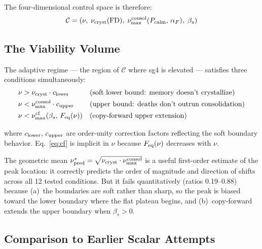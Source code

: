 \documentclass[11pt]{article}
\begin{document}
The four-dimensional control space is therefore:
\[
\mathcal{C} = (\nu,\; \nu_{\rm cryst}(\text{FD}),\; \nu_{\rm max}^{\rm consol}(P_{\rm calm},\,\alpha_F),\; \beta_s)
\]

\subsection{The Viability Volume}

The adaptive regime --- the region of $\mathcal{C}$ where sg4 is elevated ---
satisfies three conditions simultaneously:
\begin{align}
\nu &> \nu_{\rm cryst} \cdot c_{\rm lower}
   && \text{(soft lower bound: memory doesn't crystallize)} \label{eq:lower}\\
\nu &< \nu_{\rm max}^{\rm consol} \cdot c_{\rm upper}
   && \text{(upper bound: deaths don't outrun consolidation)} \label{eq:upper}\\
\nu &< \nu_{\rm max}^{\rm cf}(\beta_s,\,F_{\rm eq}(\nu))
   && \text{(copy-forward upper extension)} \label{eq:cf}
\end{align}

where $c_{\rm lower},\, c_{\rm upper}$ are order-unity correction factors
reflecting the soft boundary behavior. Eq.~\eqref{eq:cf} is implicit in $\nu$
because $F_{\rm eq}(\nu)$ decreases with $\nu$.

The geometric mean $\nu^*_{\rm pred} = \sqrt{\nu_{\rm cryst} \cdot \nu_{\rm
max}^{\rm consol}}$ is a useful first-order estimate of the peak
location: it correctly predicts the order of magnitude and direction of shifts
across all 12 tested conditions. But it fails quantitatively (ratios 0.19--0.88)
because (a)~the boundaries are soft rather than sharp, so the peak is biased
toward the lower boundary where the flat plateau begins, and (b)~copy-forward
extends the upper boundary when $\beta_s > 0$.

\subsection{Comparison to Earlier Scalar Attempts}
\end{document}
